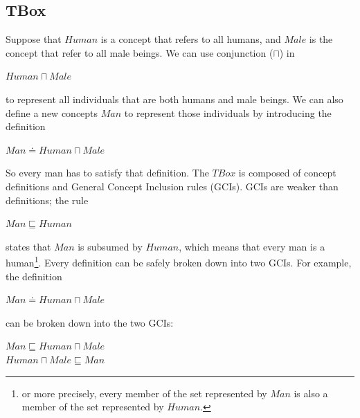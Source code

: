 \subsection{TBox}
Suppose that $Human$ is a concept that refers to all humans, and $Male$ is the concept that refer to all male beings. We can use conjunction ($\sqcap$) in
\begin{center}
$Human \sqcap Male$
\end{center}
to represent all individuals that are both humans and male beings. We can also define a new concepts $Man$ to represent those individuals by introducing the definition
\begin{center}
$Man \doteq Human \sqcap Male$
\end{center}
So every man has to satisfy that definition. The $TBox$ is composed of concept definitions and General Concept Inclusion rules (GCIs). GCIs are weaker than definitions; the rule
\begin{center}
$Man \sqsubseteq Human$
\end{center}
states that $Man$ is subsumed by $Human$, which means that every man is a human\footnote{or more precisely, every member of the set represented by $Man$ is also a member of the set represented by $Human$.}. Every definition can be safely broken down into two GCIs. For example, the definition
\begin{center}
$Man \doteq Human \sqcap Male$
\end{center}
can be broken down into the two GCIs:
\begin{center}
$Man \sqsubseteq Human \sqcap Male$ \\
$Human \sqcap Male \sqsubseteq Man$
\end{center}

